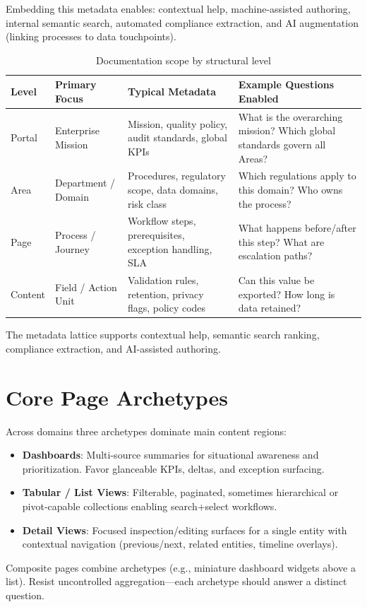 Embedding this metadata enables: contextual help, machine-assisted authoring, internal semantic search, automated compliance extraction, and AI augmentation (linking processes to data touchpoints).

\begin{table}[h]
	\centering
	\caption{Documentation scope by structural level}\label{tab:doc-scope}
	\begin{tabularx}{\textwidth}{l l X X}
		\toprule
		\textbf{Level} & \textbf{Primary Focus} & \textbf{Typical Metadata} & \textbf{Example Questions Enabled} \\
		\midrule
		Portal & Enterprise Mission & Mission, quality policy, audit standards, global KPIs & What is the overarching mission? Which global standards govern all Areas? \\
		Area & Department / Domain & Procedures, regulatory scope, data domains, risk class & Which regulations apply to this domain? Who owns the process? \\
		Page & Process / Journey & Workflow steps, prerequisites, exception handling, SLA & What happens before/after this step? What are escalation paths? \\
		Content & Field / Action Unit & Validation rules, retention, privacy flags, policy codes & Can this value be exported? How long is data retained? \\
		\bottomrule
	\end{tabularx}
	\vspace{0.5em}
	\footnotesize The metadata lattice supports contextual help, semantic search ranking, compliance extraction, and AI-assisted authoring.
\end{table}

\section{Core Page Archetypes}
Across domains three archetypes dominate main content regions:
\begin{itemize}
	\item \textbf{Dashboards}: Multi-source summaries for situational awareness and prioritization. Favor glanceable KPIs, deltas, and exception surfacing.
	\item \textbf{Tabular / List Views}: Filterable, paginated, sometimes hierarchical or pivot-capable collections enabling search+select workflows.
	\item \textbf{Detail Views}: Focused inspection/editing surfaces for a single entity with contextual navigation (previous/next, related entities, timeline overlays).
\end{itemize}
Composite pages combine archetypes (e.g., miniature dashboard widgets above a list). Resist uncontrolled aggregation—each archetype should answer a distinct question.

